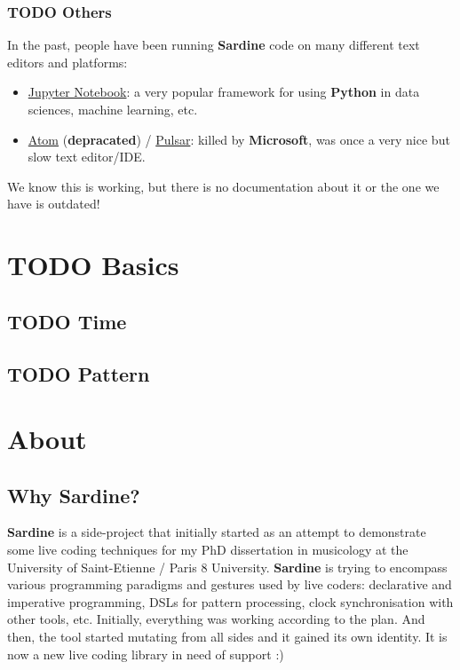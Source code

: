 \documentclass[11pt]{article}
\begin{document}
\subsubsection{{\bfseries\sffamily TODO} Others}
\label{sec:orgbe471dc}


In the past, people have been running \textbf{Sardine} code on many different text editors and platforms:
\begin{itemize}
\item \href{https://jupyter.org}{Jupyter Notebook}: a very popular framework for using \textbf{Python} in data sciences, machine learning, etc.
\item \href{https://github.com/atom}{Atom} (\textbf{depracated}) / \href{https://pulsar-edit.dev/}{Pulsar}: killed by \textbf{Microsoft}, was once a very nice but slow text editor/IDE.
\end{itemize}

We know this is working, but there is no documentation about it or the one we have is outdated!

\section{{\bfseries\sffamily TODO} Basics}
\label{sec:org265a6d7}
\subsection{{\bfseries\sffamily TODO} Time}
\label{sec:org7c6bfd0}
\subsection{{\bfseries\sffamily TODO} Pattern}
\label{sec:org17a2973}
\section{About}
\label{sec:org615194e}
\subsection{Why Sardine?}
\label{sec:org4a3d22c}

\textbf{Sardine} is a side-project that initially started as an attempt to demonstrate some live coding techniques for my PhD dissertation in musicology at the University of Saint-Etienne / Paris 8 University. \textbf{Sardine} is trying to encompass various programming paradigms and gestures used by live coders: declarative and imperative programming, DSLs for pattern processing, clock synchronisation with other tools, etc. Initially, everything was working according to the plan. And then, the tool started mutating from all sides and it gained its own identity. It is now a new live coding library in need of support :)
\end{document}

